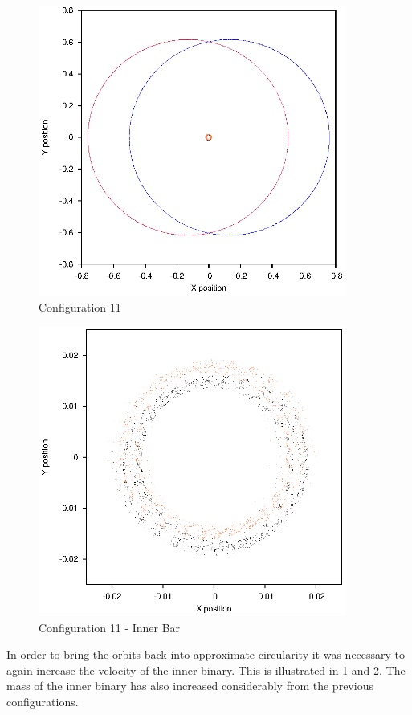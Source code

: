 \documentclass[a4paper,12pt]{article}
\begin{document}
\begin{figure}[H]
\centering
\includegraphics[width=0.9\textwidth]{./2016results/025-65-02/Orbit.eps}
\caption{Configuration 11}
\label{fig:config11}
\end{figure}
\begin{figure}[H]
\centering
\includegraphics[width=0.9\textwidth]{./2016results/025-65-02/Inner.eps}
\caption{Configuration 11 - Inner Bar}
\label{fig:config11i}
\end{figure}
In order to bring the orbits back into approximate circularity it was necessary to again increase the velocity of the inner binary. This is illustrated
in \ref{fig:config11} and \ref{fig:config11i}. The mass of the inner binary has also increased considerably from the previous configurations.
\end{document}
